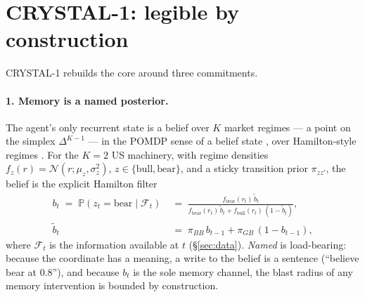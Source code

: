 \documentclass[11pt]{article}
\newcommand{\Prob}{\mathbb{P}}
\begin{document}
\section{CRYSTAL-1: legible by construction}
\label{sec:crystal}

CRYSTAL-1 rebuilds the core around three commitments.

\paragraph{1. Memory is a named posterior.} The agent's only recurrent state is a belief over
$K$ market regimes --- a point on the simplex $\Delta^{K-1}$ --- in the POMDP sense of a belief
state \citep{kaelbling1998}, over Hamilton-style regimes \citep{hamilton1989}. For the $K{=}2$
US machinery, with regime densities $f_z(r) = \mathcal{N}(r;\mu_z,\sigma_z^2)$,
$z\in\{\text{bull},\text{bear}\}$, and a sticky transition prior $\pi_{zz'}$, the belief is the
explicit Hamilton filter
\begin{align}
b_t \;=\; \Prob(z_t = \text{bear}\mid \mathcal{F}_t)
\;&=\; \frac{f_{\text{bear}}(r_t)\,\tilde b_t}
{f_{\text{bear}}(r_t)\,\tilde b_t + f_{\text{bull}}(r_t)\,(1-\tilde b_t)},
\label{eq:belief}\\
\tilde b_t \;&=\; \pi_{BB}\, b_{t-1} + \pi_{GB}\,(1-b_{t-1}),\nonumber
\end{align}
where $\mathcal{F}_t$ is the information available at $t$ (\S\ref{sec:data}). \emph{Named} is
load-bearing: because the coordinate has a meaning, a write to the belief is a sentence
(``believe bear at $0.8$''), and because $b_t$ is the sole memory channel, the blast radius of
any memory intervention is bounded by construction.
\end{document}
